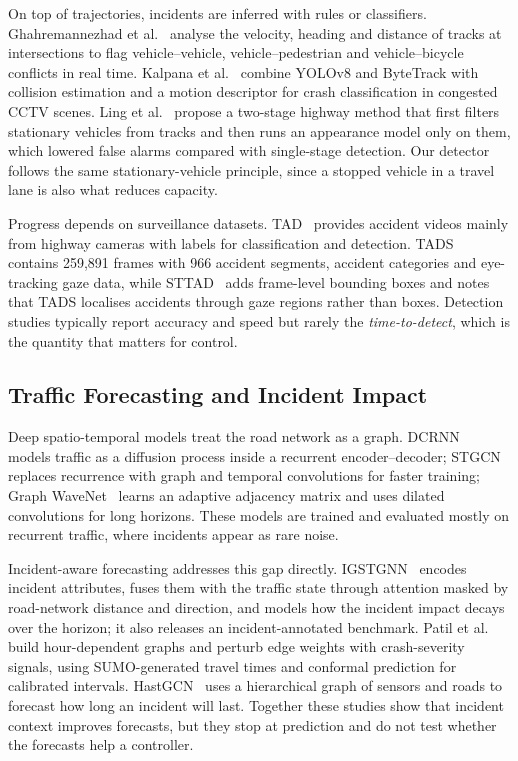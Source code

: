 \documentclass[conference]{IEEEtran}
\begin{document}
On top of trajectories, incidents are inferred with rules or classifiers. Ghahremannezhad et al.~\cite{ghahremannezhad2022realtime} analyse the velocity, heading and distance of tracks at intersections to flag vehicle--vehicle, vehicle--pedestrian and vehicle--bicycle conflicts in real time. Kalpana et al.~\cite{kalpana2025yolov8bytetrack} combine YOLOv8 and ByteTrack with collision estimation and a motion descriptor for crash classification in congested CCTV scenes. Ling et al.~\cite{ling2025highway} propose a two-stage highway method that first filters stationary vehicles from tracks and then runs an appearance model only on them, which lowered false alarms compared with single-stage detection. Our detector follows the same stationary-vehicle principle, since a stopped vehicle in a travel lane is also what reduces capacity.

Progress depends on surveillance datasets. TAD~\cite{xu2025tad} provides accident videos mainly from highway cameras with labels for classification and detection. TADS~\cite{tads} contains 259{,}891 frames with 966 accident segments, accident categories and eye-tracking gaze data, while STTAD~\cite{xu2025sttad} adds frame-level bounding boxes and notes that TADS localises accidents through gaze regions rather than boxes. Detection studies typically report accuracy and speed but rarely the \emph{time-to-detect}, which is the quantity that matters for control.

\subsection{Traffic Forecasting and Incident Impact}
Deep spatio-temporal models treat the road network as a graph. DCRNN~\cite{li2018dcrnn} models traffic as a diffusion process inside a recurrent encoder--decoder; STGCN~\cite{yu2018stgcn} replaces recurrence with graph and temporal convolutions for faster training; Graph WaveNet~\cite{wu2019graphwavenet} learns an adaptive adjacency matrix and uses dilated convolutions for long horizons. These models are trained and evaluated mostly on recurrent traffic, where incidents appear as rare noise.

Incident-aware forecasting addresses this gap directly. IGSTGNN~\cite{igstgnn2026} encodes incident attributes, fuses them with the traffic state through attention masked by road-network distance and direction, and models how the incident impact decays over the horizon; it also releases an incident-annotated benchmark. Patil et al.~\cite{patil2026incident} build hour-dependent graphs and perturb edge weights with crash-severity signals, using SUMO-generated travel times and conformal prediction for calibrated intervals. HastGCN~\cite{hastgcn2021} uses a hierarchical graph of sensors and roads to forecast how long an incident will last. Together these studies show that incident context improves forecasts, but they stop at prediction and do not test whether the forecasts help a controller.
\end{document}

